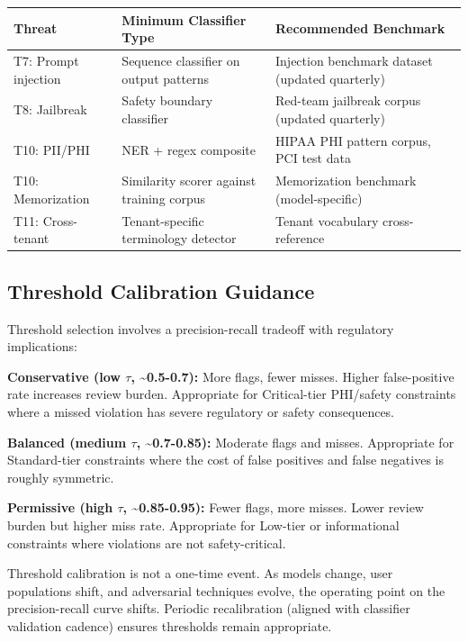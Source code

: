 \begin{table}[ht]
  \centering\small
  \begin{tabular}{@{}>{\raggedright\arraybackslash}p{2.66cm}>{\raggedright\arraybackslash}p{5.45cm}>{\raggedright\arraybackslash}p{6.24cm}@{}}
  \toprule
  Threat & Minimum Classifier Type & Recommended Benchmark \\
  \midrule
  T7: Prompt injection & Sequence classifier on output patterns & Injection benchmark dataset (updated quarterly) \\
  T8: Jailbreak & Safety boundary classifier & Red-team jailbreak corpus (updated quarterly) \\
  T10: PII/PHI & NER + regex composite & HIPAA PHI pattern corpus, PCI test data \\
  T10: Memorization & Similarity scorer against training corpus & Memorization benchmark (model-specific) \\
  T11: Cross-tenant & Tenant-specific terminology detector & Tenant vocabulary cross-reference \\
  \bottomrule
  \end{tabular}
\end{table}


\subsection{Threshold Calibration Guidance}
\label{sec:templates-C-2-3}


Threshold selection involves a precision-recall tradeoff with regulatory implications:

\textbf{Conservative (low $\tau$, \textasciitilde{}0.5-0.7):} More flags, fewer misses. Higher false-positive rate increases review burden. Appropriate for Critical-tier PHI/safety constraints where a missed violation has severe regulatory or safety consequences.

\textbf{Balanced (medium $\tau$, \textasciitilde{}0.7-0.85):} Moderate flags and misses. Appropriate for Standard-tier constraints where the cost of false positives and false negatives is roughly symmetric.

\textbf{Permissive (high $\tau$, \textasciitilde{}0.85-0.95):} Fewer flags, more misses. Lower review burden but higher miss rate. Appropriate for Low-tier or informational constraints where violations are not safety-critical.

Threshold calibration is not a one-time event. As models change, user populations shift, and adversarial techniques evolve, the operating point on the precision-recall curve shifts. Periodic recalibration (aligned with classifier validation cadence) ensures thresholds remain appropriate.





